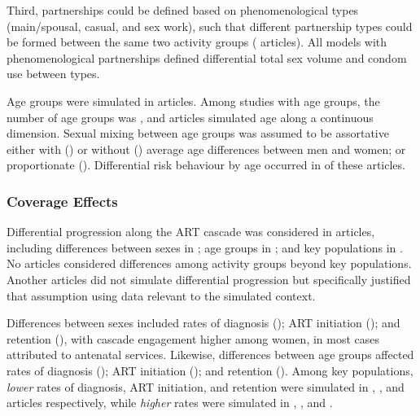 Third, partnerships could be defined based on phenomenological types 
(main/spousal, casual, and sex work), such that
different partnership types could be formed between the same two activity groups ( articles).
All models with phenomenological partnerships defined differential total sex volume and condom use between types.
\par
Age groups were simulated in  articles.
Among studies with age groups, the number of age groups was ,
and  articles simulated age along a continuous dimension.
Sexual mixing between age groups was assumed to be assortative
either with () or without ()
average age differences between men and women;
or proportionate ().
Differential risk behaviour by age occurred in  of these  articles.
\subsubsection{Coverage Effects}
\label{sss:res:cov}
Differential progression along the ART cascade was considered in
 articles, including differences between
sexes in ;
age groups in ; and
key populations in .
No articles considered differences among activity groups beyond key populations. %
Another  articles did not simulate differential progression
but specifically justified that assumption using data relevant to the simulated context.
\par
Differences between sexes included
rates of diagnosis ();
ART initiation (); and
retention (),
with cascade engagement higher among women,
in most cases attributed to antenatal services.
Likewise, differences between age groups affected
rates of diagnosis ();
ART initiation (); and
retention ().
Among key populations, \emph{lower} rates of
diagnosis, ART initiation, and retention were simulated in
, , and 
articles respectively, while \emph{higher} rates were simulated in
, , and .
